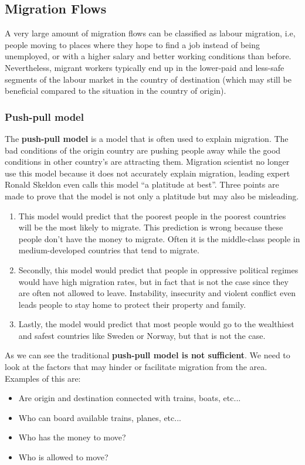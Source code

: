 \documentclass[../summary.tex]{subfiles}
\begin{document}
	\subsection{Migration Flows}
	A very large amount of migration flows can be classified as labour migration, i.e, people moving to places where they hope to find a job instead of being unemployed, or with a higher salary and better working conditions than before. Nevertheless, migrant workers typically end up in the lower-paid and less-safe segments of the labour market in the country of destination (which may still be beneficial compared to the situation in the country of origin).
	
	\subsubsection{Push-pull model}
	The \textbf{push-pull model} is a model that is often used to explain migration. The bad conditions of the origin country are pushing people away while the good conditions in other country's are attracting them. Migration scientist no longer use this model because it does not accurately explain migration, leading expert Ronald Skeldon even calls this model ``a platitude at best''. Three points are made to prove that the model is not only a platitude but may also be misleading.
	\begin{enumerate}
		\item This model would predict that the poorest people in the poorest countries will be the most likely to migrate. This prediction is wrong because these people don't have the money to migrate. Often it is the middle-class people in medium-developed countries that tend to migrate. 
		\item Secondly, this model would predict that people in oppressive political regimes would have high migration rates, but in fact that is not the case since they are often not allowed to leave. Instability, insecurity and violent conflict even leads people to stay home to protect their property and family.
		\item Lastly, the model would predict that most people would go to the wealthiest and safest countries like Sweden or Norway, but that is not the case.
	\end{enumerate}
	As we can see the traditional \textbf{push-pull model is not sufficient}. We need to look at the factors that may hinder or facilitate migration from the area. Examples of this are:
	\begin{itemize}
		\item Are origin and destination connected with trains, boats, etc...
		\item Who can board available trains, planes, etc...
		\item Who has the money to move?
		\item Who is allowed to move?
	\end{itemize}
	\newpage
	
\end{document}
